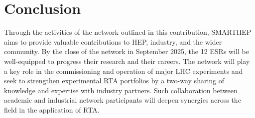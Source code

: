 \section{Conclusion}
\label{conclusion}
Through the activities of the network outlined in this contribution, SMARTHEP aims to provide valuable contributions to HEP, industry, and the wider community. By the close of the network in September 2025, the 12 ESRs will be well-equipped to progress their research and their careers. The network will play a key role in the commissioning and operation of major LHC experiments and seek to strengthen experimental RTA portfolios by a two-way sharing of knowledge and expertise with industry partners. Such collaboration between academic and industrial network participants will deepen synergies across the field in the application of RTA.